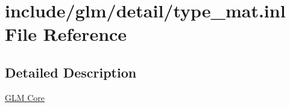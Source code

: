 \hypertarget{type__mat_8inl}{}\section{include/glm/detail/type\+\_\+mat.inl File Reference}
\label{type__mat_8inl}


\subsection{Detailed Description}
\hyperlink{group__core}{G\+LM Core} 